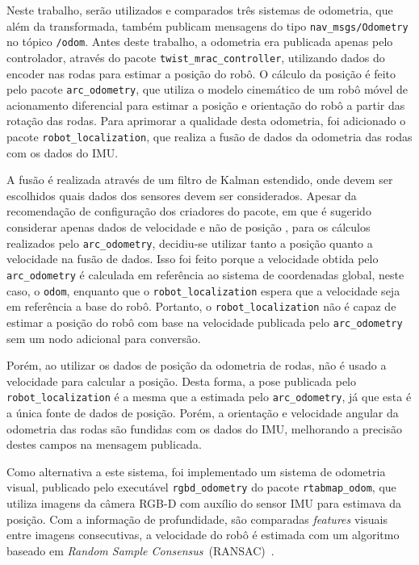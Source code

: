 \documentclass[repeatfields,xlists,xpacks,oneside,yearsonly]{ufrgscca}
\begin{document}
Neste trabalho, serão utilizados e comparados três sistemas de
odometria, que além da transformada, também publicam mensagens do
tipo \texttt{nav\_msgs/Odometry} no tópico \texttt{/odom}. Antes
deste trabalho, a odometria era publicada apenas pelo controlador,
através do pacote \texttt{twist\_mrac\_controller}, utilizando dados
do encoder nas rodas para estimar a posição do robô. O cálculo da
posição é feito pelo pacote \texttt{arc\_odometry}, que utiliza o
modelo cinemático de um robô móvel de acionamento diferencial para
estimar a posição e orientação do robô a partir das rotação das
rodas. Para aprimorar a qualidade desta odometria, foi adicionado o
pacote \texttt{robot\_localization}, que realiza a fusão de dados da
odometria das rodas com os dados do IMU.

A fusão é realizada através de um filtro de Kalman estendido, onde
devem ser escolhidos quais dados dos sensores devem ser considerados.
Apesar da recomendação de configuração dos criadores do pacote, em que
é sugerido considerar apenas dados de velocidade e não de posição
\cite{robot_localization_guide}, para os cálculos realizados pelo
\texttt{arc\_odometry}, decidiu-se utilizar tanto a posição quanto a
velocidade na fusão de dados. Isso foi feito porque a velocidade
obtida pelo \texttt{arc\_odometry} é calculada em referência ao
sistema de coordenadas global, neste caso, o \texttt{odom}, enquanto
que o \texttt{robot\_localization} espera que a velocidade seja em
referência a base do robô. Portanto, o \texttt{robot\_localization}
não é capaz de estimar a posição do robô com base na velocidade
publicada pelo \texttt{arc\_odometry} sem um nodo adicional para
conversão.

Porém, ao utilizar os dados de posição da odometria de rodas, não é
usado a velocidade para calcular a posição. Desta forma, a pose
publicada pelo \texttt{robot\_localization} é a mesma que a estimada
pelo \texttt{arc\_odometry}, já que esta é a única fonte de dados de
posição. Porém, a orientação e velocidade angular da odometria das
rodas são fundidas com os dados do IMU, melhorando a precisão destes
campos na mensagem publicada.

Como alternativa a este sistema, foi implementado um sistema de
odometria visual, publicado pelo executável \texttt{rgbd\_odometry}
do pacote \texttt{rtabmap\_odom}, que utiliza imagens da câmera RGB-D
com auxílio do sensor IMU para estimava da posição. Com a informação
de profundidade, são comparadas \textit{features} visuais entre
imagens consecutivas, a velocidade do robô é estimada com um
algoritmo baseado em \textit{Random Sample
    Consensus}~(RANSAC)~\cite{rtabmap_odom}.
\end{document}
